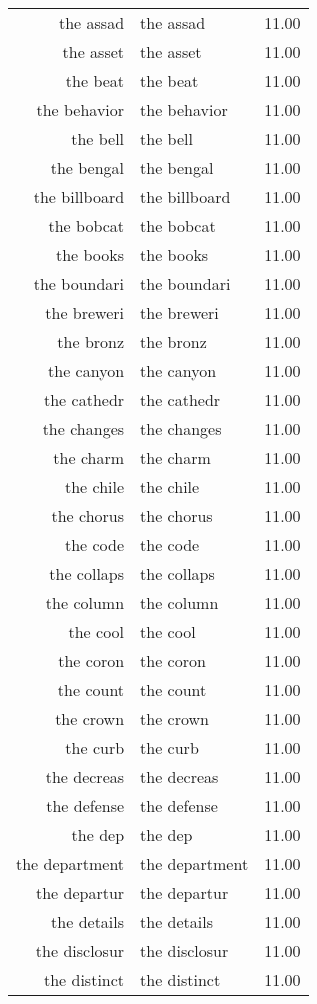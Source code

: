 \begin{table}[ht]
\begin{tabular}{rlr}
  the assad & the assad & 11.00 \\ 
  the asset & the asset & 11.00 \\ 
  the beat & the beat & 11.00 \\ 
  the behavior & the behavior & 11.00 \\ 
  the bell & the bell & 11.00 \\ 
  the bengal & the bengal & 11.00 \\ 
  the billboard & the billboard & 11.00 \\ 
  the bobcat & the bobcat & 11.00 \\ 
  the books & the books & 11.00 \\ 
  the boundari & the boundari & 11.00 \\ 
  the breweri & the breweri & 11.00 \\ 
  the bronz & the bronz & 11.00 \\ 
  the canyon & the canyon & 11.00 \\ 
  the cathedr & the cathedr & 11.00 \\ 
  the changes & the changes & 11.00 \\ 
  the charm & the charm & 11.00 \\ 
  the chile & the chile & 11.00 \\ 
  the chorus & the chorus & 11.00 \\ 
  the code & the code & 11.00 \\ 
  the collaps & the collaps & 11.00 \\ 
  the column & the column & 11.00 \\ 
  the cool & the cool & 11.00 \\ 
  the coron & the coron & 11.00 \\ 
  the count & the count & 11.00 \\ 
  the crown & the crown & 11.00 \\ 
  the curb & the curb & 11.00 \\ 
  the decreas & the decreas & 11.00 \\ 
  the defense & the defense & 11.00 \\ 
  the dep & the dep & 11.00 \\ 
  the department & the department & 11.00 \\ 
  the departur & the departur & 11.00 \\ 
  the details & the details & 11.00 \\ 
  the disclosur & the disclosur & 11.00 \\ 
  the distinct & the distinct & 11.00 \\ 

\end{tabular}
\end{table}
